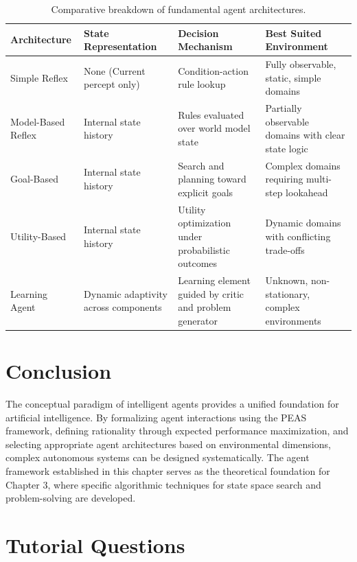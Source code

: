 \documentclass[12pt]{report}
\begin{document}
\begin{table}[htbp]
\centering
\small
\begin{tabularx}{\textwidth}{@{} >{\raggedright\arraybackslash}p{2.8cm} X X X @{}}
\toprule
\textbf{Architecture} & \textbf{State Representation} & \textbf{Decision Mechanism} & \textbf{Best Suited Environment} \\
\midrule
Simple Reflex & None (Current percept only) & Condition-action rule lookup & Fully observable, static, simple domains \\
Model-Based Reflex & Internal state history & Rules evaluated over world model state & Partially observable domains with clear state logic \\
Goal-Based & Internal state history & Search and planning toward explicit goals & Complex domains requiring multi-step lookahead \\
Utility-Based & Internal state history & Utility optimization under probabilistic outcomes & Dynamic domains with conflicting trade-offs \\
Learning Agent & Dynamic adaptivity across components & Learning element guided by critic and problem generator & Unknown, non-stationary, complex environments \\
\bottomrule
\end{tabularx}
\caption{Comparative breakdown of fundamental agent architectures.}
\label{tab:architecture_comparison}
\end{table}

\section{Conclusion}

The conceptual paradigm of intelligent agents provides a unified foundation for artificial intelligence. By formalizing agent interactions using the PEAS framework, defining rationality through expected performance maximization, and selecting appropriate agent architectures based on environmental dimensions, complex autonomous systems can be designed systematically. The agent framework established in this chapter serves as the theoretical foundation for Chapter 3, where specific algorithmic techniques for state space search and problem-solving are developed.

\section*{Tutorial Questions}
\end{document}
